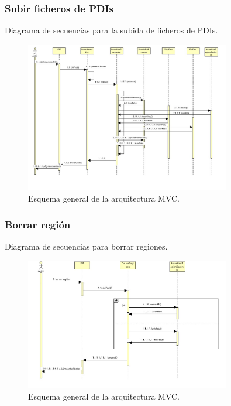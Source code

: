 \subsubsection{Subir ficheros de PDIs}
Diagrama de secuencias para la subida de ficheros de PDIs.
\begin{figure}[!htbp]
  \centering
    \includegraphics[width=0.8\textwidth]{../img/diagramas/secuencias/3.jpg}
  \caption{Esquema general de la arquitectura MVC.}
  \label{mvc}
\end{figure}

\subsubsection{Borrar región}
Diagrama de secuencias para borrar regiones.
\begin{figure}[!htbp]
  \centering
    \includegraphics[width=0.8\textwidth]{../img/diagramas/secuencias/5.jpg}
  \caption{Esquema general de la arquitectura MVC.}
  \label{mvc}
\end{figure}

